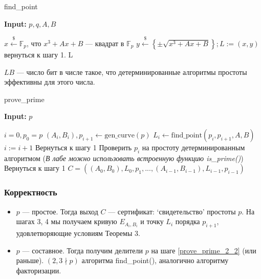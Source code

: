 \documentclass[12pt]{article}
\newcommand{\F}{{{\mathbb F}}}
\theoremstyle{definition}
\theoremstyle{definition}
\theoremstyle{definition}
\begin{document}
\begin{algorithm}[H]
	\caption{find\_point}
	\label{alg:Find_point}
    \textbf{Input:} $p, q, A, B$

	\begin{algorithmic}[1]
		\State $x \xleftarrow{\$} \F_p$, что $x^3+Ax+B$ — квадрат в $\F_p$
		\State $y \xleftarrow{\$} \left\{ \pm \sqrt{x^3 + Ax+B} \right\}; L:=(x,y)$
		    \State вернуться к шагу 1.
		\EndIf
		\State \Return L
	\end{algorithmic}
\end{algorithm}

$LB$ — число бит в числе такое, что детерминированные алгоритмы простоты эффективны для этого числа.

\begin{algorithm}[H]
	\caption{prove\_prime}
	\label{alg:Prove_prime}
    \textbf{Input:} $p$

	\begin{algorithmic}[1]
		\State $i = 0, p_0 = p$
		    \State $(A_i, B_i), p_{i+1} \leftarrow \text{gen\_curve}(p)$ \label{prove_prime_2_1}
		    \State $L_i \leftarrow \text{find\_point} (p_i, p_{i+1}, A, B)$\label{prove_prime_2_1} \label{prove_prime_2_2}
		    \State $i := i+1$
		        \State Вернуться к шагу 1
		    \EndIf
		\EndWhile
		\State Проверить $p_i$ на простоту детерминированным алгоритмом (\textit{В лабе можно использовать встроенную функцию \textsf{is\_prime()}}) \label{prove_prime_3}
		    \State Вернуться к шагу 1
		\EndIf
		\State \Return $C = ((A_0, B_0), L_0, p_1, ..., (A_{i-1}, B_{i-1}), L_{i-1}, p_{i-1})$
	\end{algorithmic}
\end{algorithm}

\subsubsection{Корректность}
\begin{itemize}
    \item $p$ — простое. Тогда выход $C$ — сертификат:  `свидетельство' простоты $p$. На шагах 3, 4 мы получаем кривую $E_{A_i, B_i}$  и точку $L_i$ порядка $p_{i+1}$, удовлетворяющие условиям Теоремы 3.
    \item $p$ — составное. Тогда получим делители $p$ на шаге \ref{prove_prime_2_2} (или раньше). $(2, 3 \nmid p)$ алгоритма find\_point(), аналогично алгоритму факторизации. 
\end{itemize}
\end{document}
